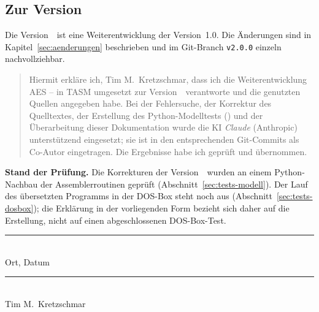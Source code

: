 \subsection{Zur Version \versionProjekt}\label{sec:erklaerung-v2}
Die Version~\versionProjekt\ ist eine Weiterentwicklung der Version~1.0. Die Änderungen sind in Kapitel~\ref{sec:aenderungen} beschrieben und im Git-Branch \texttt{v2.0.0} einzeln nachvollziehbar.

\begin{quote}
Hiermit erkläre ich, Tim M.\ Kretzschmar, dass ich die Weiterentwicklung \glqq AES -- in TASM umgesetzt\grqq{} zur Version~\versionProjekt\ verantworte und die genutzten Quellen angegeben habe. Bei der Fehlersuche, der Korrektur des Quelltextes, der Erstellung des Python-Modelltests () und der Überarbeitung dieser Dokumentation wurde die KI \emph{Claude} (Anthropic) unterstützend eingesetzt; sie ist in den entsprechenden Git-Commits als Co-Autor eingetragen. Die Ergebnisse habe ich geprüft und übernommen.
\end{quote}

\textbf{Stand der Prüfung.} Die Korrekturen der Version~\versionProjekt\ wurden an einem Python-Nachbau der Assemblerroutinen geprüft (Abschnitt~\ref{sec:tests-modell}). Der Lauf des übersetzten Programms in der DOS-Box steht noch aus (Abschnitt~\ref{sec:tests-dosbox}); die Erklärung in der vorliegenden Form bezieht sich daher auf die Erstellung, nicht auf einen abgeschlossenen DOS-Box-Test.

\vspace{8mm}
\noindent
\begin{minipage}{\textwidth}
    \begin{minipage}[b]{0.46\textwidth}
        \rule{\textwidth}{0.4pt}\\[1mm]
        \small Ort, Datum
    \end{minipage}\hfill
    \begin{minipage}[b]{0.46\textwidth}
        \rule{\textwidth}{0.4pt}\\[1mm]
        \small Tim M.\ Kretzschmar
    \end{minipage}
\end{minipage}\par

